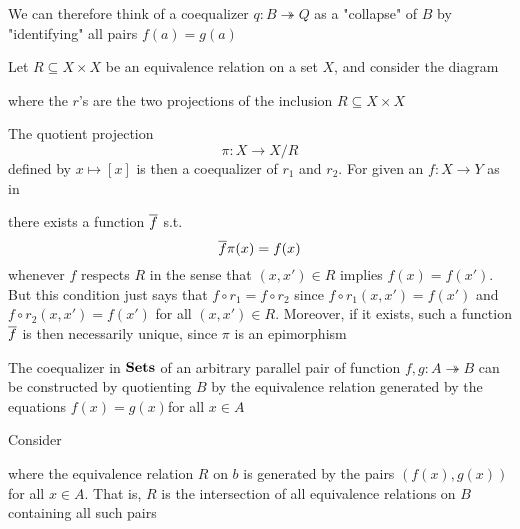 \documentclass[11pt]{article}
\begin{document}
We can therefore think of a coequalizer \(q:B\twoheadrightarrow Q\) as a
"collapse" of \(B\) by "identifying" all pairs \(f(a)=g(a)\)

\begin{examplle}[]
Let \(R\subseteq X\times X\) be an equivalence relation on a set \(X\), and
consider the diagram
\begin{center}\end{center}
where the \(r\)'s are the two projections of the inclusion
\(R\subseteq X\times X\)
\begin{center}\end{center}
The quotient projection
\begin{equation*}
\pi:X\to X/R
\end{equation*}
defined by \(x\mapsto[x]\) is then a coequalizer of \(r_1\) and \(r_2\). For
given an \(f:X\to Y\) as in
\begin{center}\end{center}
there exists a function \(\overline{f}\) s.t.
\begin{equation*}
\overline{f}\pi (x)=f(x)
\end{equation*}
whenever \(f\) respects \(R\) in the sense that \((x,x')\in R\) implies
\(f(x)=f(x')\). But this condition just says that \(f\circ r_1=f\circ
   r_2\) since \(f\circ r_1(x,x')=f(x')\) and \(f\circ r_2(x,x')=f(x')\) for all
\((x,x')\in R\). Moreover, if it exists, such a function \(\overline{f}\) is then
necessarily unique, since \(\pi\) is an epimorphism

The coequalizer in \(\operatorname{\textbf{Sets}}\) of an arbitrary parallel pair of function
\(f,g:A\twoheadrightarrow B\) can be constructed by quotienting \(B\) by the
equivalence relation generated by the equations \(f(x)=g(x)\)for all \(x\in
   A\)

Consider
\begin{center}\end{center}
where the equivalence relation \(R\) on \(b\) is generated by the pairs
\((f(x),g(x))\) for all \(x\in A\). That is, \(R\) is the intersection of all
equivalence relations on \(B\) containing all such pairs
\end{examplle}
\end{document}
